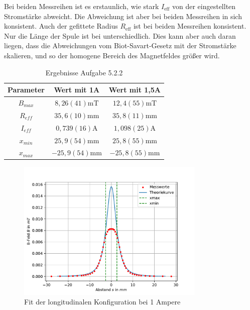\documentclass[11pt, a4paper]{article}
\begin{document}
    Bei beiden Messreihen ist es erstaunlich, wie stark $I_{\text{eff}}$ von der eingestellten Stromstärke abweicht. Die Abweichung ist aber bei beiden Messreihen in sich konsistent. Auch der gefittete Radius $R_{\text{eff}}$ ist bei beiden Messreihen konsistent. Nur die Länge der Spule ist bei unterschiedlich. Dies kann aber auch daran liegen, dass die Abweichungen vom Biot-Savart-Gesetz mit der Stromstärke skalieren, und so der homogene Bereich des Magnetfeldes größer wird.
    \begin{table}[h]
        \centering
        \begin{tabular}{c | c | c}
            \textbf{Parameter} & \textbf{Wert mit 1A} & \textbf{Wert mit 1,5A} \\
            \hline
            $B_{max}$ & $8,26(41) \si{\milli\tesla}$ & $12,4(55) \si{\milli\tesla}$ \\
            $R_{eff}$ & $35,6(10) \si{\milli\metre}$ & $35,8(11) \si{\milli\metre}$ \\
            $I_{eff}$ & $0,739(16) \si{\ampere}$ & $1,098(25) \si{\ampere}$ \\
            $x_{min}$ & $25,9(54) \si{\milli\meter}$ & $25,8(55) \si{\milli\meter}$ \\
            $x_{max}$ & $-25,9(54) \si{\milli\meter}$ & $-25,8(55) \si{\milli\meter}$ \\
        \end{tabular}
        \caption{Ergebnisse Aufgabe 5.2.2}
        \label{tab:fit}
    \end{table}

    \begin{figure}
        \centering
        \includegraphics[width=0.8\textwidth]{fit1.pdf}
        \caption{Fit der longitudinalen Konfiguration bei 1 Ampere}
        \label{fig:longfit1a}
    \end{figure}
\end{document}
